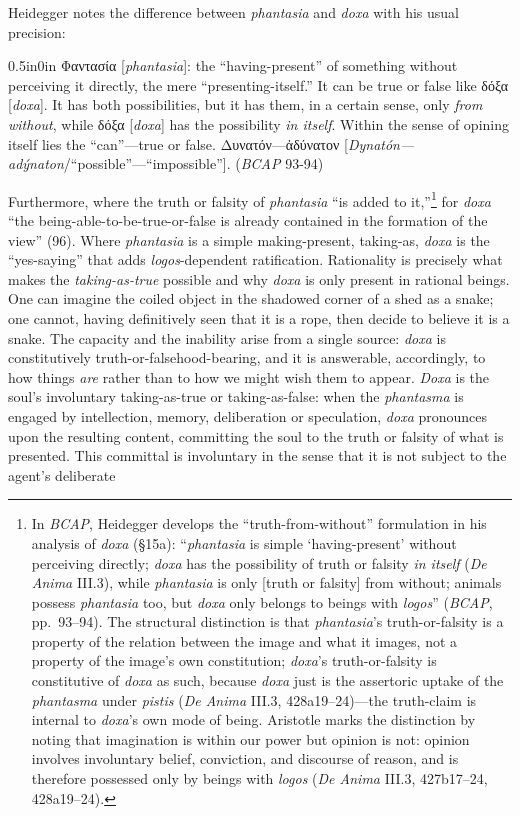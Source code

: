 \documentclass{article}
\newcommand{\gk}[1]{{\greekfont #1}}
\begin{document}
Heidegger notes the difference between \textit{phantasia} and \textit{doxa} with his usual precision: 
\begin{adjustwidth}{0.5in}{0in}
    \gk{Φαντασία} [\textit{phantasia}]: the ``having-present'' of something without perceiving it directly, the mere ``presenting-itself.'' It can be true or false like \gk{δόξα} [\textit{doxa}]. It has both possibilities, but it has them, in a certain sense, only \textit{from without}, while \gk{δόξα} [\textit{doxa}] has the possibility \textit{in itself}. Within the sense of opining itself lies the ``can''---true or false. \gk{Δυνατόν---ἀδύνατον} [\textit{Dynatón---adýnaton}/``possible''---``impossible'']. (\textit{BCAP} 93-94)
\end{adjustwidth}
Furthermore, where the truth or falsity of \textit{phantasia} ``is added to it,''\footnote{In \textit{BCAP}, Heidegger develops the ``truth-from-without'' formulation in his analysis of \textit{doxa} (§15a): ``\textit{phantasia} is simple `having-present' without perceiving directly; \textit{doxa} has the possibility of truth or falsity \textit{in itself} (\textit{De Anima} III.3), while \textit{phantasia} is only [truth or falsity] from without; animals possess \textit{phantasia} too, but \textit{doxa} only belongs to beings with \textit{logos}'' (\textit{BCAP}, pp.~93--94). The structural distinction is that \textit{phantasia}'s truth-or-falsity is a property of the relation between the image and what it images, not a property of the image's own constitution; \textit{doxa}'s truth-or-falsity is constitutive of \textit{doxa} as such, because \textit{doxa} just is the assertoric uptake of the \textit{phantasma} under \textit{pistis} (\textit{De Anima} III.3, 428a19--24)---the truth-claim is internal to \textit{doxa}'s own mode of being. Aristotle marks the distinction by noting that imagination is within our power but opinion is not: opinion involves involuntary belief, conviction, and discourse of reason, and is therefore possessed only by beings with \textit{logos} (\textit{De Anima} III.3, 427b17--24, 428a19--24).} for \textit{doxa} ``the being-able-to-be-true-or-false is already contained in the formation of the view'' (96). Where \textit{phantasia} is a simple making-present, taking-as, \textit{doxa} is the ``yes-saying'' that adds \textit{logos}-dependent ratification. Rationality is precisely what makes the \textit{taking-as-true} possible and why \textit{doxa} is only present in rational beings. One can imagine the coiled object in the shadowed corner of a shed as a snake; one cannot, having definitively seen that it is a rope, then decide to believe it is a snake. The capacity and the inability arise from a single source: \textit{doxa} is constitutively truth-or-falsehood-bearing, and it is answerable, accordingly, to how things \textit{are} rather than to how we might wish them to appear. \textit{Doxa} is the soul's involuntary taking-as-true or taking-as-false: when the \textit{phantasma} is engaged by intellection, memory, deliberation or speculation, \textit{doxa} pronounces upon the resulting content, committing the soul to the truth or falsity of what is presented. This committal is involuntary in the sense that it is not subject to the agent's deliberate 
\end{document}
